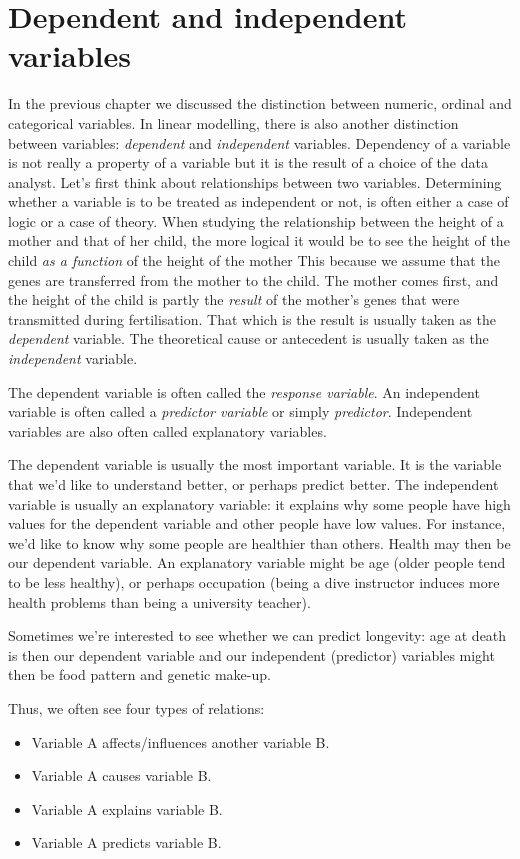 \documentclass[]{report}\usepackage[]{graphicx}\usepackage[]{color}
\begin{document}
\section{Dependent and independent variables}
In the previous chapter we discussed the distinction between numeric, ordinal and categorical variables. In linear modelling, there is also another distinction between variables: \textit{dependent} and \textit{independent} variables. Dependency of a variable is not really a property of a variable but it is the result of a choice of the data analyst. Let's first think about relationships between two variables. Determining whether a variable is to be treated as independent or not, is often either a case of logic or a case of theory. When studying the relationship between the height of a mother and that of her child, the more logical it would be to see the height of the child \textit{as a function} of the height of the mother This because we assume that the genes are transferred from the mother to the child. The mother comes first, and the height of the child is partly the \textit{result} of the mother's genes that were transmitted during fertilisation. That which is the result is usually taken as the \textit{dependent} variable. The theoretical cause or antecedent is usually taken as the \textit{independent} variable. 

The dependent variable is often called the \textit{response variable}. An independent variable is often called a \textit{predictor variable} or simply \textit{predictor}. Independent variables are also often called explanatory variables.

The dependent variable is usually the most important variable. It is the variable that we'd like to understand better, or perhaps predict better. The independent variable is usually an explanatory variable: it explains why some people have high values for the dependent variable and other people have low values. For instance, we'd like to know why some people are healthier than others. Health may then be our dependent variable. An explanatory variable might be age (older people tend to be less healthy), or perhaps occupation (being a dive instructor induces more health problems than being a university teacher). 

Sometimes we're interested to see whether we can predict longevity: age at death is then our dependent variable and our independent (predictor) variables might then be food pattern and genetic make-up. 

Thus, we often see four types of relations:
\begin{itemize}
\item Variable A affects/influences another variable B.
\item Variable A causes variable B.
\item Variable A explains variable B.
\item Variable A predicts variable B.
\end{itemize}
\end{document}
